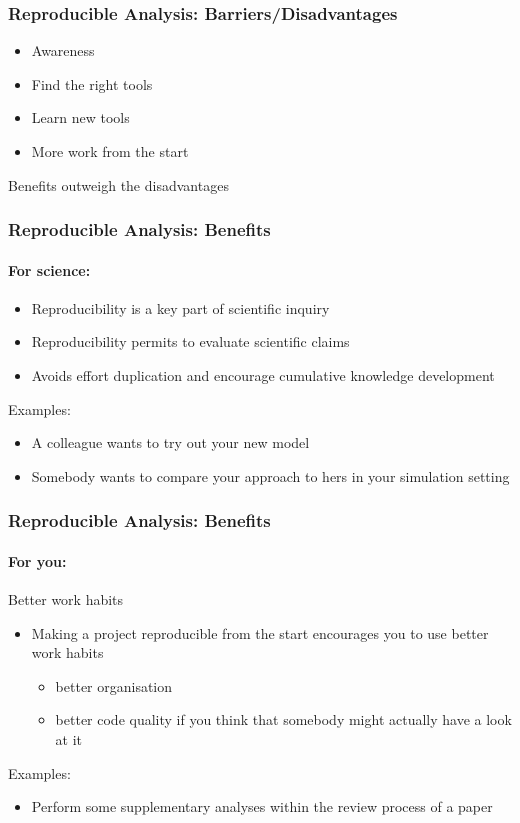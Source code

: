 \documentclass[paper=screen,mathserif]{beamer}\usepackage[]{graphicx}\usepackage[]{color}
\begin{document}
\begin{frame}
  \frametitle{Reproducible Analysis: Barriers/Disadvantages}
  \begin{itemize}
  \item Awareness
  \item Find the right tools
  \item Learn new tools
  \item More work from the start
  \end{itemize}
  \pause\vspace{0.6cm}
  Benefits outweigh the disadvantages  
\end{frame}

\begin{frame}
  \frametitle{Reproducible Analysis: Benefits}
  \framesubtitle{For science:}
\begin{itemize}
\item Reproducibility is a key part of scientific inquiry
\item Reproducibility permits to evaluate scientific claims
\item Avoids effort duplication and encourage cumulative knowledge
  development
\end{itemize}
Examples:
\begin{itemize}
\item A colleague wants to try out your new model
\item Somebody wants to compare your approach to hers in your
  simulation setting 
\end{itemize}
\end{frame}

\begin{frame}
  \frametitle{Reproducible Analysis: Benefits}
  \framesubtitle{For you:}
  Better work habits
  \begin{itemize}
  \item Making a project reproducible from the start encourages you to
    use better work habits
    \begin{itemize}
    \item better organisation
    \item better code quality if you think that somebody might
      actually have a look at it 
    \end{itemize}
  \end{itemize}
  Examples:
  \begin{itemize}
  \item Perform some supplementary analyses within the review process
    of a paper
  \end{itemize}
\end{frame}
\end{document}
